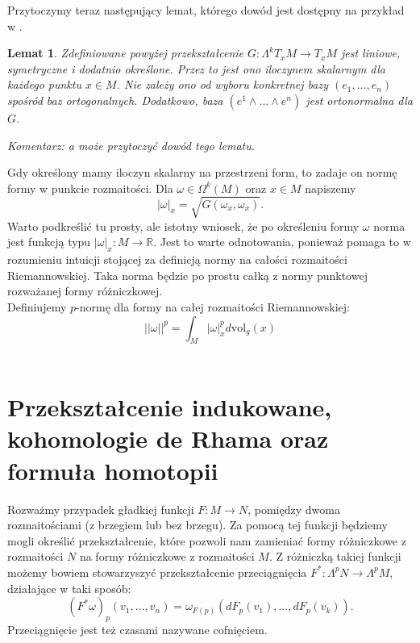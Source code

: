 \documentclass[licencjacka]{pracamgr}
\theoremstyle{definition}
\theoremstyle{definition}
\theoremstyle{plain}
\newtheorem{lemma}{Lemat}[section]
\theoremstyle{plain}
\theoremstyle{plain}
\begin{document}
Przytoczymy teraz następujący lemat, którego dowód jest dostępny na przykład
 w \cite{lausanne}.

\begin{lemma}
    Zdefiniowane powyżej przekształcenie $G: \Lambda^k T_x M \rightarrow T_x M $ 
    jest liniowe, symetryczne i dodatnio określone. Przez to jest ono iloczynem
    skalarnym dla każdego punktu $x \in M$.  Nie zależy ono od wyboru konkretnej bazy
    $(e_1, ..., e_n)$ spośród baz ortogonalnych.  Dodatkowo, baza
    $(e^1 \wedge ... \wedge e^n)$ jest ortonormalna dla $G$.
\end{lemma}

\emph{Komentarz: a może przytoczyć dowód tego lematu.}


Gdy określony mamy iloczyn skalarny na przestrzeni form, to zadaje on 
normę formy w punkcie rozmaitości. Dla $\omega \in \Omega^k(M)$ oraz $x \in M$
napiszemy
\[
    |\omega|_x = \sqrt{ G(\omega_x, \omega_x) }.
\]
Warto podkreślić tu prosty, ale istotny wniosek, że po określeniu formy $\omega$
norma jest funkcją typu $| \omega |_x : M \rightarrow \mathbb{R} $. Jest to warte
odnotowania, ponieważ pomaga to w rozumieniu intuicji stojącej za definicją normy
na całości rozmaitości Riemannowskiej. Taka norma będzie po prostu całką 
z normy punktowej rozważanej formy różniczkowej. \\

Definiujemy $p$-normę dla formy na całej rozmaitości Riemannowskiej:
\begin{equation} \label{big-norm}
  || \omega ||^p =  \int_M |\omega|_x^p d \text{vol}_g(x)
\end{equation} \\



\section{Przekształcenie indukowane, kohomologie de Rhama oraz formuła homotopii}
Rozważmy przypadek gładkiej funkcji $F: M \rightarrow N$, pomiędzy
dwoma rozmaitościami (z brzegiem lub bez brzegu). Za pomocą tej
funkcji będziemy mogli określić przekształcenie, które pozwoli nam
zamieniać formy różniczkowe z rozmaitości $N$ na formy różniczkowe z
rozmaitości $M$. Z różniczką takiej funkcji możemy bowiem stowarzyszyć
przekształcenie
przeciągnięcia $F^\ast: \Lambda^p N \rightarrow \Lambda^p M$, działające w taki sposób:
\[
    (F^\ast \omega)_p(v_1, ..., v_n) =
        \omega_{F(p)}(dF_p(v_1), ..., dF_p(v_k)).
\] Przeciągnięcie jest też czasami nazywane cofnięciem. \\
\end{document}
